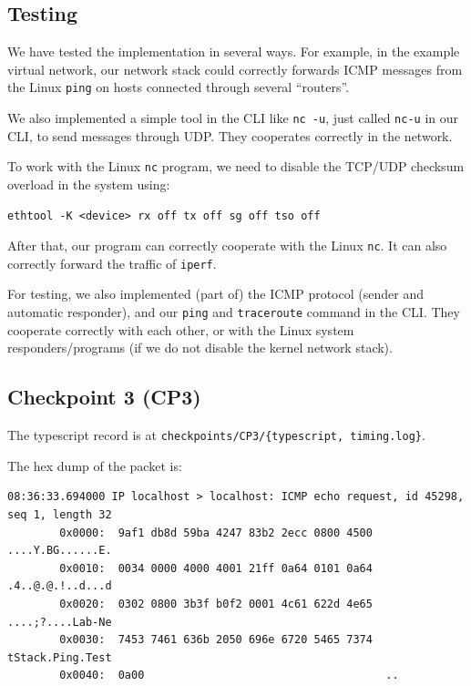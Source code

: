 \documentclass[a4paper]{article}
\begin{document}
  \subsection{Testing}

  We have tested the implementation in several ways. For example, in the example virtual network, our network stack could correctly forwards ICMP messages from the Linux \texttt{ping} on hosts connected through several ``routers''.

  We also implemented a simple tool in the CLI like \texttt{nc -u}, just called \texttt{nc-u} in our CLI, to send messages through UDP. They cooperates correctly in the network.

  To work with the Linux \texttt{nc} program, we need to disable the TCP/UDP checksum overload in the system using:
  \begin{verbatim}
ethtool -K <device> rx off tx off sg off tso off
  \end{verbatim}
  After that, our program can correctly cooperate with the Linux \texttt{nc}.
  It can also correctly forward the traffic of \texttt{iperf}.

  For testing, we also implemented (part of) the ICMP protocol (sender and automatic responder), and our \texttt{ping} and \texttt{traceroute} command in the CLI.
  They cooperate correctly with each other, or with the Linux system responders/programs (if we do not disable the kernel network stack).

  \subsection{Checkpoint 3 (CP3)}

  The typescript record is at \texttt{checkpoints/CP3/\{typescript, timing.log\}}.

  The hex dump of the packet is:
  \begin{verbatim}
08:36:33.694000 IP localhost > localhost: ICMP echo request, id 45298, seq 1, length 32
        0x0000:  9af1 db8d 59ba 4247 83b2 2ecc 0800 4500  ....Y.BG......E.
        0x0010:  0034 0000 4000 4001 21ff 0a64 0101 0a64  .4..@.@.!..d...d
        0x0020:  0302 0800 3b3f b0f2 0001 4c61 622d 4e65  ....;?....Lab-Ne
        0x0030:  7453 7461 636b 2050 696e 6720 5465 7374  tStack.Ping.Test
        0x0040:  0a00                                     ..
  \end{verbatim}
\end{document}
